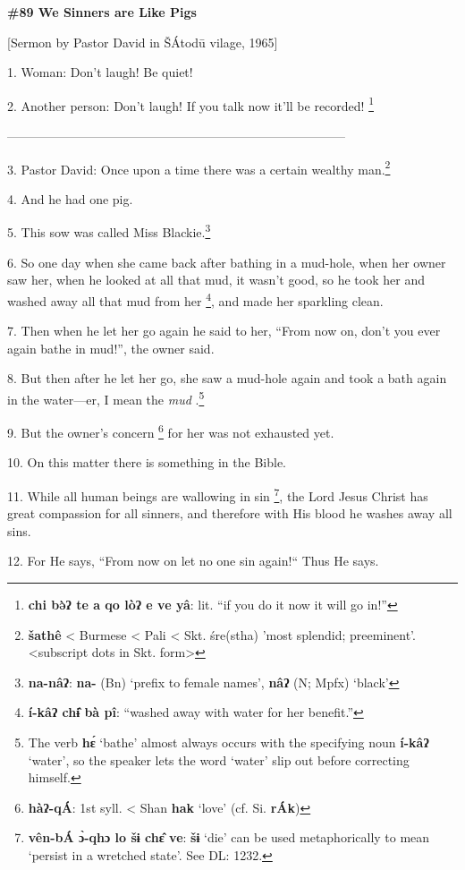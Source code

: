 
\textbf{\#89  We Sinners are Like Pigs}

[Sermon by Pastor David in ŠÁtodū vilage, 1965]

1. Woman: Don't laugh! Be quiet!

2. Another person: Don't laugh! If you talk now it'll be recorded! \footnote{\textbf{chi bə̀ʔ te a qo lòʔ e ve yâ}: lit. ``if you do it now it will go in!''}

---------------------------------------------------------------------------------

3. Pastor David: Once upon a time there was a certain wealthy man.\footnote{\textbf{šathê }< Burmese < Pali < Skt. śre(stha) 'most splendid; preeminent'.  <subscript dots in Skt. form>}

4. And he had one pig.

5. This sow was called Miss Blackie.\footnote{\textbf{na-nâʔ}:\textbf{ na-} (Bn) `prefix to female names', \textbf{nâʔ} (N; Mpfx) `black'}

6. So one day when she came back after bathing in a mud-hole, when her owner saw
her, when he looked at all that mud, it wasn't good, so he took her and washed
away all that mud from her \footnote{\textbf{í-kâʔ chɨ̂ bà pî}: ``washed away with water for her benefit.''}, and made her sparkling clean.

7. Then when he let her go again he said to her, ``From now on, don't you ever
again bathe in mud!'', the owner said.

8. But then after he let her go, she saw a mud-hole again and took a bath again
in the water---er, I mean the \textit{mud }.\footnote{The verb \textbf{hɛ́} `bathe' almost always occurs with the specifying noun \textbf{í-kâʔ} `water', so the speaker lets the word `water' slip out before correcting himself.}

9. But the owner's concern \footnote{\textbf{ hàʔ-qÁ}: 1st syll. < Shan \textbf{hak} `love' (cf. Si. \textbf{rÁk})} for her was not exhausted yet.

10. On this matter there is something in the Bible.

11. While all human beings are wallowing in sin \footnote{\textbf{vên-bÁ ɔ̀-qhɔ lo šɨ chɛ̂ ve}: \textbf{šɨ} `die' can be used metaphorically to mean `persist in a wretched state'. See DL: 1232.}, the Lord Jesus Christ has
great compassion for all sinners, and therefore with His blood he washes away all
sins.

12. For He says, ``From now on let no one sin again!`` Thus He says.

